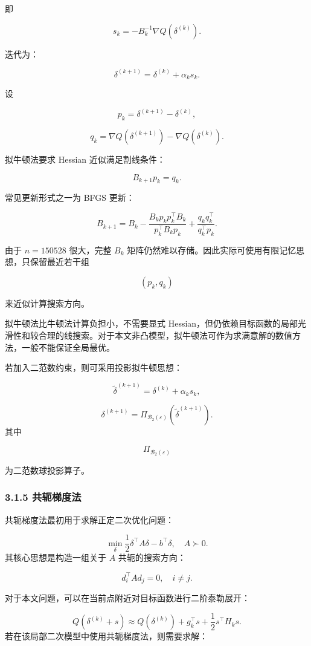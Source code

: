 ﻿\documentclass[UTF8,zihao=-4,fontset=none]{ctexart}
\begin{document}
即

\[
s_k=-B_k^{-1}\nabla Q(\delta^{(k)}).
\]

迭代为：

\[
\delta^{(k+1)}
=
\delta^{(k)}+\alpha_ks_k.
\]

设

\[
p_k=\delta^{(k+1)}-\delta^{(k)},
\]

\[
q_k=\nabla Q(\delta^{(k+1)})-\nabla Q(\delta^{(k)}).
\]

拟牛顿法要求 Hessian 近似满足割线条件：

\[
B_{k+1}p_k=q_k.
\]

常见更新形式之一为 BFGS 更新：

\[
B_{k+1}
=
B_k
-
\frac{B_kp_kp_k^\top B_k}{p_k^\top B_kp_k}
+
\frac{q_kq_k^\top}{q_k^\top p_k}.
\]

由于 \(n=150528\) 很大，完整 \(B_k\) 矩阵仍然难以存储。因此实际可使用有限记忆思想，只保留最近若干组

\[
(p_k,q_k)
\]

来近似计算搜索方向。

拟牛顿法比牛顿法计算负担小，不需要显式 Hessian，但仍依赖目标函数的局部光滑性和较合理的线搜索。对于本文非凸模型，拟牛顿法可作为求满意解的数值方法，一般不能保证全局最优。

若加入二范数约束，则可采用投影拟牛顿思想：

\[
\tilde{\delta}^{(k+1)}
=
\delta^{(k)}+\alpha_ks_k,
\]

\[
\delta^{(k+1)}
=
\Pi_{\mathcal{B}_2(\varepsilon)}
(\tilde{\delta}^{(k+1)}).
\]
\noindent 其中

\[
\Pi_{\mathcal{B}_2(\varepsilon)}
\]

为二范数球投影算子。

\subsubsection*{3.1.5 共轭梯度法}
{}

共轭梯度法最初用于求解正定二次优化问题：

\[
\min_\delta
\frac12\delta^\top A\delta-b^\top\delta,
\quad A\succ0.
\]
\noindent 其核心思想是构造一组关于 \(A\) 共轭的搜索方向：

\[
d_i^\top A d_j=0,\quad i\ne j.
\]

对于本文问题，可以在当前点附近对目标函数进行二阶泰勒展开：

\[
Q(\delta^{(k)}+s)
\approx
Q(\delta^{(k)})
+
g_k^\top s
+
\frac12s^\top H_ks.
\]
\noindent 若在该局部二次模型中使用共轭梯度法，则需要求解：
\end{document}
